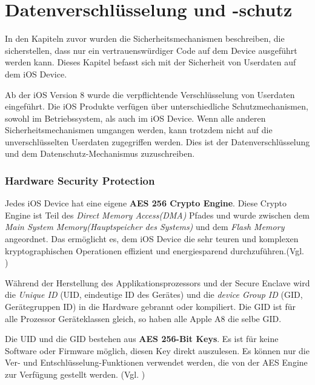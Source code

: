\section{Datenverschlüsselung und -schutz}
\label{sec:EncryptionandDataProtection}

In den Kapiteln zuvor wurden die Sicherheitsmechanismen beschreiben, die sicherstellen, dass nur ein vertrauenswürdiger Code auf dem Device ausgeführt werden kann. Dieses Kapitel befasst sich mit der Sicherheit von Userdaten auf dem iOS Device. 

Ab der iOS Version 8 wurde die verpflichtende Verschlüsselung von Userdaten eingeführt. Die iOS Produkte verfügen über unterschiedliche Schutzmechanismen, sowohl im Betriebssystem, als auch im iOS Device. Wenn alle anderen Sicherheitsmechanismen umgangen werden, kann trotzdem nicht auf die unverschlüsselten Userdaten zugegriffen werden. Dies ist der Datenverschlüsselung und dem Datenschutz-Mechanismus zuzuschreiben.

\subsubsection{Hardware Security Protection}
\label{sec:HardwareSecProtection}

Jedes iOS Device hat eine eigene \textbf{AES 256 Crypto Engine}. Diese Crypto Engine ist Teil des \textit{\glqq Direct Memory Access(DMA)\grqq{}} Pfades und wurde zwischen dem \textit{\glqq Main System Memory(Hauptspeicher des Systems)\grqq{}} und dem \textit{\glqq Flash Memory\grqq{}} angeordnet. Das ermöglicht es, dem iOS Device die sehr teuren und komplexen kryptographischen Operationen effizient und energiesparend durchzuführen.(Vgl. \cite{iOSSec[5], iOSSec[2],iOSSec[1], Apple[4], Apple[5], Apple[6], Apple[3]})

Während der Herstellung des Applikationsprozessors und der Secure Enclave wird die \textit{\glqq Unique ID\grqq{}} (UID, eindeutige ID des Gerätes) und die \textit{\glqq device Group ID\grqq{}} (GID, Gerätegruppen ID) in die Hardware gebrannt oder kompiliert. Die GID ist für alle Prozessor Geräteklassen gleich, so haben alle Apple A8 die selbe GID. \par 
Die UID und die GID bestehen aus \textbf{AES 256-Bit Keys}. Es ist für keine Software oder Firmware möglich, diesen Key direkt auszulesen. Es können nur die Ver- und Entschlüsselung-Funktionen verwendet werden, die von der AES Engine zur Verfügung gestellt werden. (Vgl. \cite{iOSSec[5], iOSSec[2],iOSSec[1], Apple[4], Apple[5], Apple[6], Apple[3]})

